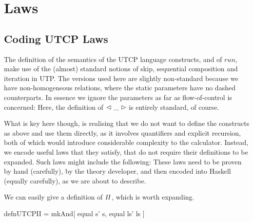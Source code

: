 \section{Laws}\label{sec:Laws}




\subsection{Coding UTCP Laws}

The definition of the semantics of the UTCP language
constructs, and of $run$,
make use of the (almost) standard notions of skip,
sequential composition
and iteration in UTP.
The versions used here are slightly non-standard because we have
non-homogeneous relations,
where the static parameters have no dashed counterparts.
In essence we ignore the parameters as far as flow-of-control is concerned:
Here, the definition of $\mathrel{\lhd ~ {\_} ~ \rhd}$ is entirely standard, of course.

What is key here though,
is realising that we do not want to define the constructs
as above and use them directly, as it involves
quantifiers and explicit recursion,
both of which would introduce considerable complexity to the calculator.
Instead, we encode useful laws that they satisfy,
that do not require their definitions to be expanded.
Such laws might include the following:
These laws need to be proven by hand (carefully),
by the theory developer, and then encoded into Haskell
(equally carefully), as we are about to describe.

We can easily give a definition of $\mathit{II}$,
which is worth expanding.
\begin{code}
defnUTCPII = mkAnd[ equal s' s, equal ls' ls ]
\end{code}

